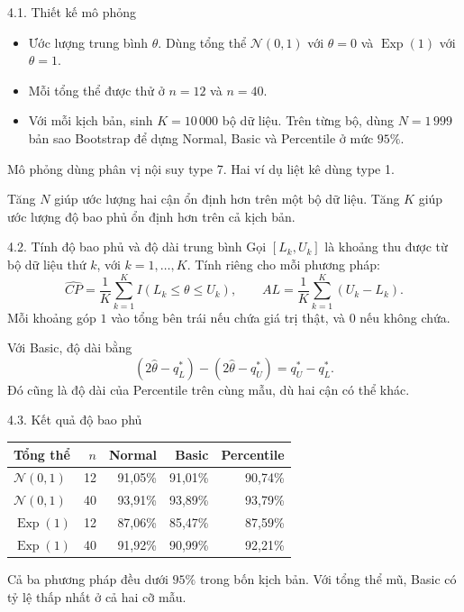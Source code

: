 \documentclass[aspectratio=43,10pt]{beamer}
\newcommand{\slidesource}{}
\begin{document}
\renewcommand{\slidesource}{Nguồn: Báo cáo nhóm D, tr. 12--13}
\begin{frame}{4.1. Thiết kế mô phỏng}
    \begin{itemize}
        \item Ước lượng trung bình $\theta$. Dùng tổng thể $\mathcal N(0,1)$ với $\theta=0$ và $\operatorname{Exp}(1)$ với $\theta=1$.
        \item Mỗi tổng thể được thử ở $n=12$ và $n=40$.
        \item Với mỗi kịch bản, sinh $K=10\,000$ bộ dữ liệu. Trên từng bộ, dùng $N=1\,999$ bản sao Bootstrap để dựng Normal, Basic và Percentile ở mức $95\%$.
    \end{itemize}
    \medskip
    Mô phỏng dùng phân vị nội suy type 7. Hai ví dụ liệt kê dùng type 1.
    \medskip

    Tăng $N$ giúp ước lượng hai cận ổn định hơn trên một bộ dữ liệu. Tăng $K$ giúp ước lượng độ bao phủ ổn định hơn trên cả kịch bản.
\end{frame}

\renewcommand{\slidesource}{Nguồn: Báo cáo nhóm D, tr. 12--13}
\begin{frame}{4.2. Tính độ bao phủ và độ dài trung bình}
    Gọi $[L_k,U_k]$ là khoảng thu được từ bộ dữ liệu thứ $k$, với $k=1,\ldots,K$. Tính riêng cho mỗi phương pháp:
    \[
    \widehat{CP}=\frac1K\sum_{k=1}^K I(L_k\le\theta\le U_k),
    \qquad
    AL=\frac1K\sum_{k=1}^K (U_k-L_k).
    \]
    Mỗi khoảng góp $1$ vào tổng bên trái nếu chứa giá trị thật, và $0$ nếu không chứa.
    \medskip

    Với Basic, độ dài bằng
    \[
    (2\hat\theta-q_L^*)-(2\hat\theta-q_U^*)=q_U^*-q_L^*.
    \]
    Đó cũng là độ dài của Percentile trên cùng mẫu, dù hai cận có thể khác.
\end{frame}

\renewcommand{\slidesource}{Nguồn: Báo cáo nhóm D, tr. 13--14, Bảng 6.1 và Hình 6.1}
\begin{frame}{4.3. Kết quả độ bao phủ}
    \centering
    \begin{tabular}{lrrrr}
    \toprule
    Tổng thể & $n$ & Normal & Basic & Percentile\\
    \midrule
    $\mathcal N(0,1)$ & 12 & 91,05\% & 91,01\% & 90,74\%\\
    $\mathcal N(0,1)$ & 40 & 93,91\% & 93,89\% & 93,79\%\\
    $\operatorname{Exp}(1)$ & 12 & 87,06\% & 85,47\% & 87,59\%\\
    $\operatorname{Exp}(1)$ & 40 & 91,92\% & 90,99\% & 92,21\%\\
    \bottomrule
    \end{tabular}\par
    \medskip\raggedright
    Cả ba phương pháp đều dưới $95\%$ trong bốn kịch bản. Với tổng thể mũ, Basic có tỷ lệ thấp nhất ở cả hai cỡ mẫu.
\end{frame}
\end{document}
